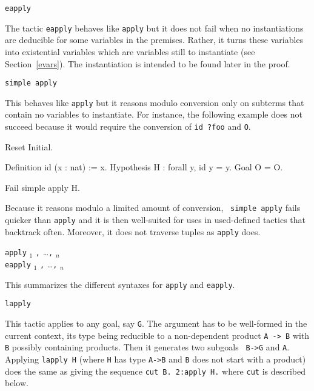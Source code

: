 \begin{coq_example*}
\begin{Variants}
\item {\tt eapply \term}

  The tactic {\tt eapply} behaves like {\tt apply} but it does not fail
  when no instantiations are deducible for some variables in the
  premises. Rather, it turns these variables into 
  existential variables which are variables still to instantiate (see
  Section~\ref{evars}). The instantiation is intended to be found
  later in the proof.

\item {\tt simple apply {\term}} 

  This behaves like {\tt apply} but it reasons modulo conversion only
  on subterms that contain no variables to instantiate. For instance,
  the following example does not succeed because it would require the
  conversion of {\tt id ?foo} and {\tt O}.

\begin{coq_eval}
Reset Initial.
\end{coq_eval}
\begin{coq_example*}
Definition id (x : nat) := x.
Hypothesis H : forall y, id y = y.
Goal O = O.
\end{coq_example*}
\begin{coq_example}
Fail simple apply H.
\end{coq_example}

  Because it reasons modulo a limited amount of conversion, {\tt
  simple apply} fails quicker than {\tt apply} and it is then
  well-suited for uses in used-defined tactics that backtrack often.
  Moreover, it does not traverse tuples as {\tt apply} does.

\item {} {\tt apply} {\term$_1$}  {\tt ,} \ldots {\tt ,} {\term$_n$} \\
   {\tt eapply} {\term$_1$}  {\tt ,} \ldots {\tt ,} {\term$_n$} 

  This summarizes the different syntaxes for {\tt apply} and {\tt eapply}.

\item {\tt lapply {\term}} 

  This tactic applies to any goal, say {\tt G}.  The argument {\term}
  has to be well-formed in the current context, its type being
  reducible to a non-dependent product {\tt A -> B} with {\tt B}
  possibly containing products. Then it generates two subgoals {\tt
  B->G} and {\tt A}. Applying {\tt lapply H} (where {\tt H} has type
  {\tt A->B} and {\tt B} does not start with a product) does the same
  as giving the sequence {\tt cut B. 2:apply H.} where {\tt cut} is
  described below.


\end{Variants}
\end{coq_example*}
